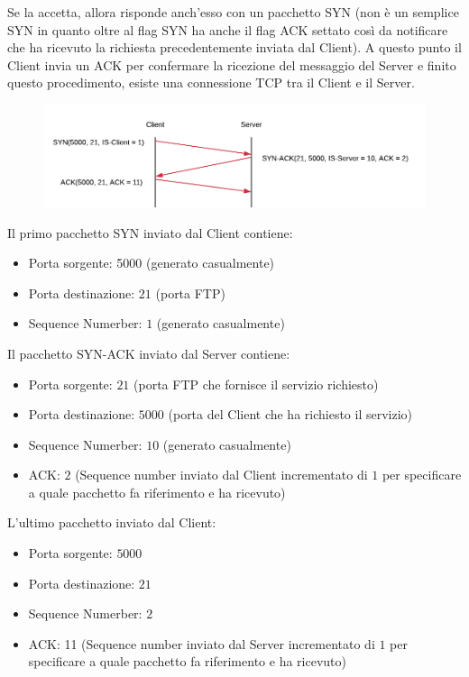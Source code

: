 \documentclass[10pt,a4paper]{article}
\begin{document}
\begin{enumerate}
		Se la accetta, allora risponde anch'esso con un pacchetto SYN (non è un semplice SYN in quanto oltre al flag SYN ha anche il flag ACK settato così da notificare che ha ricevuto la richiesta precedentemente inviata dal Client). A questo punto il Client invia un ACK per confermare la ricezione 
		del messaggio del Server e finito questo procedimento, esiste una connessione TCP tra il Client e il Server.
			\begin{figure}[H]
				\centering
				\includegraphics[width=15cm]{Esame812019_FTPHandshake}
			\end{figure}
			Il primo pacchetto SYN inviato dal Client contiene:
			\begin{itemize}
				\item Porta sorgente: 5000 (generato casualmente)
				\item Porta destinazione: $21$ (porta FTP)
				\item Sequence Numerber: $1$ (generato casualmente)
			\end{itemize}
			Il pacchetto SYN-ACK inviato dal Server contiene:
			\begin{itemize}
				\item Porta sorgente: $21$ (porta FTP che fornisce il servizio richiesto)
				\item Porta destinazione: $5000$ (porta del Client che ha richiesto il servizio)
				\item Sequence Numerber: $10$ (generato casualmente)
				\item ACK: $2$ (Sequence number inviato dal Client incrementato di $1$ per specificare a quale pacchetto fa riferimento e ha ricevuto)
			\end{itemize}
			L'ultimo pacchetto inviato dal Client:
			\begin{itemize}
				\item Porta sorgente: $5000$ 
				\item Porta destinazione: $21$ 
				\item Sequence Numerber: $2$
				\item ACK: 11 (Sequence number inviato dal Server incrementato di $1$ per specificare a quale pacchetto fa riferimento e ha ricevuto)

\end{itemize}
\end{enumerate}
\end{document}
